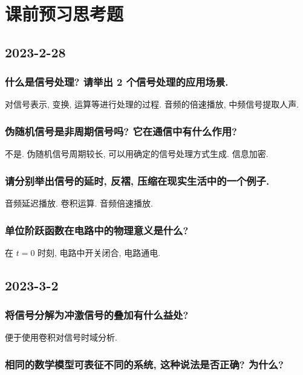 \section{课前预习思考题} \label{课前预习思考题}
\subsection{2023-2-28}

\subsubsection*{什么是信号处理? 请举出 2 个信号处理的应用场景.}

对信号表示, 变换, 运算等进行处理的过程. 音频的倍速播放, 中频信号提取人声.

\subsubsection*{伪随机信号是非周期信号吗? 它在通信中有什么作用?}

不是. 伪随机信号周期较长, 可以用确定的信号处理方式生成. 信息加密.

\subsubsection*{请分别举出信号的延时, 反褶, 压缩在现实生活中的一个例子.}

音频延迟播放. 卷积运算. 音频倍速播放.

\subsubsection*{单位阶跃函数在电路中的物理意义是什么?}

在 $t=0$ 时刻, 电路中开关闭合, 电路通电.

\subsection{2023-3-2}

\subsubsection*{将信号分解为冲激信号的叠加有什么益处?}

便于使用卷积对信号时域分析.

\subsubsection*{相同的数学模型可表征不同的系统, 这种说法是否正确? 为什么?}


